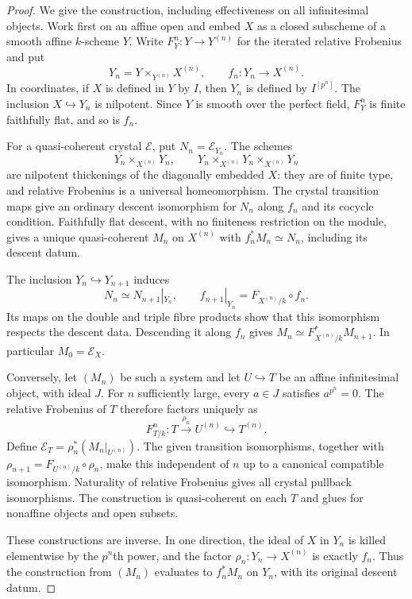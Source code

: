\begin{proof}
We give the construction, including effectiveness on all infinitesimal objects.  Work first on an affine open and embed $X$ as a closed subscheme of a smooth affine $k$-scheme $Y$.  Write $F_Y^n:Y\to Y^{(n)}$ for the iterated relative Frobenius and put
\[
       Y_n=Y\times_{Y^{(n)}}X^{(n)},\qquad
       f_n:Y_n\longrightarrow X^{(n)}.
\]
In coordinates, if $X$ is defined in $Y$ by $I$, then $Y_n$ is defined by $I^{[p^n]}$.  The inclusion $X\hookrightarrow Y_n$ is nilpotent.  Since $Y$ is smooth over the perfect field, $F_Y^n$ is finite faithfully flat, and so is $f_n$.

For a quasi-coherent crystal $\mathcal E$, put $N_n=\mathcal E_{Y_n}$.  The schemes
\[
       Y_n\times_{X^{(n)}}Y_n,\qquad
       Y_n\times_{X^{(n)}}Y_n\times_{X^{(n)}}Y_n
\]
are nilpotent thickenings of the diagonally embedded $X$: they are of finite type, and relative Frobenius is a universal homeomorphism.  The crystal transition maps give an ordinary descent isomorphism for $N_n$ along $f_n$ and its cocycle condition.  Faithfully flat descent, with no finiteness restriction on the module, gives a unique quasi-coherent $M_n$ on $X^{(n)}$ with $f_n^*M_n\simeq N_n$, including its descent datum.

The inclusion $Y_n\hookrightarrow Y_{n+1}$ induces
\[
       N_n\simeq N_{n+1}|_{Y_n},\qquad
       f_{n+1}|_{Y_n}=F_{X^{(n)}/k}\circ f_n.
\]
Its maps on the double and triple fibre products show that this isomorphism respects the descent data.  Descending it along $f_n$ gives
$M_n\simeq F_{X^{(n)}/k}^*M_{n+1}$.  In particular $M_0=\mathcal E_X$.

Conversely, let $(M_n)$ be such a system and let $U\hookrightarrow T$ be an affine infinitesimal object, with ideal $J$.  For $n$ sufficiently large, every $a\in J$ satisfies $a^{p^n}=0$.  The relative Frobenius of $T$ therefore factors uniquely as
\[
       F_{T/k}^n:T\xrightarrow{\rho_n}U^{(n)}
                        \hookrightarrow T^{(n)}.
\]
Define $\mathcal E_T=\rho_n^*(M_n|_{U^{(n)}})$.  The given transition isomorphisms, together with
$\rho_{n+1}=F_{U^{(n)}/k}\circ\rho_n$, make this independent of $n$ up to a canonical compatible isomorphism.  Naturality of relative Frobenius gives all crystal pullback isomorphisms.  The construction is quasi-coherent on each $T$ and glues for nonaffine objects and open subsets.

These constructions are inverse.  In one direction, the ideal of $X$ in $Y_n$ is killed elementwise by the $p^n$th power, and the factor $\rho_n:Y_n\to X^{(n)}$ is exactly $f_n$.  Thus the construction from $(M_n)$ evaluates to $f_n^*M_n$ on $Y_n$, with its original descent datum.


\end{proof}
